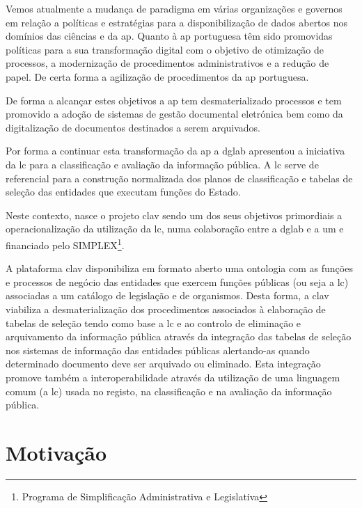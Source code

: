 Vemos atualmente a mudança de paradigma em várias organizações e governos em relação a políticas e estratégias para a disponibilização de dados abertos nos domínios das ciências e da \acrfull{ap}. Quanto à \acrlong{ap} portuguesa têm sido promovidas políticas para a sua transformação digital com o objetivo de otimização de processos, a modernização de procedimentos administrativos e a redução de papel. De certa forma a agilização de procedimentos da \acrlong{ap} portuguesa.~\cite{clav}

De forma a alcançar estes objetivos a \acrlong{ap} tem desmaterializado processos e tem promovido a adoção de sistemas de gestão documental eletrónica bem como da digitalização de documentos destinados a serem arquivados.~\cite{clav}

Por forma a continuar esta transformação da \acrshort{ap} a \acrfull{dglab} apresentou a iniciativa da \acrfull{lc} para a classificação e avaliação da informação pública. A \acrshort{lc} serve de referencial para a construção normalizada dos planos de classificação e tabelas de seleção das entidades que executam funções do Estado.~\cite{clav}

Neste contexto, nasce o projeto \acrfull{clav} sendo um dos seus objetivos primordiais a operacionalização da utilização da \acrshort{lc}, numa colaboração entre a \acrshort{dglab} e a \acrfull{um} e financiado pelo SIMPLEX\footnote{Programa de Simplificação Administrativa e Legislativa}.~\cite{clav}

A plataforma \acrshort{clav} disponibiliza em formato aberto uma ontologia com as funções e processos de negócio das entidades que exercem funções públicas (ou seja a \acrshort{lc}) associadas a um catálogo de legislação e de organismos. Desta forma, a \acrshort{clav} viabiliza a desmaterialização dos procedimentos associados à elaboração de tabelas de seleção tendo como base a \acrshort{lc} e ao controlo de eliminação e arquivamento da informação pública através da integração das tabelas de seleção nos sistemas de informação das entidades públicas alertando-as quando determinado documento deve ser arquivado ou eliminado. Esta integração promove também a interoperabilidade através da utilização de uma linguagem comum (a \acrshort{lc}) usada no registo, na classificação e na avaliação da informação pública.~\cite{clav}

\section{Motivação}

